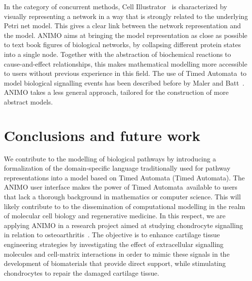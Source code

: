 \documentclass[journal, 10pt]{IEEEtran}
\def\tas{Timed Automata}
\begin{document}
In the category of concurrent methods, Cell Illustrator~\cite{cell-illustrator} is characterized by visually representing
a network in a way that is strongly related to the underlying Petri net model. This gives a clear link between the
network representation and the model. ANIMO aims at bringing 
the model representation as close as possible to text book figures of biological networks, by collapsing different protein states into a 
single node. Together with the abstraction of biochemical reactions to cause-and-effect relationships, this makes mathematical 
modelling more accessible to users without previous experience in this field. 
The use of \tas\ to model biological signalling events has been described before by Maler and Batt~\cite{oded-ta-discretization}. 
ANIMO takes a less general approach, tailored for the construction of more abstract models.



\section{Conclusions and future work}\label{sec:conclusions}
We contribute to the modelling of biological pathways by introducing a formalization of the
domain-specific language traditionally used for pathway representations into a model based on Timed Automata (\tas).
The ANIMO user interface makes the power of \tas\ available 
to users that lack a thorough background in mathematics or computer science. This will likely contribute to to the 
dissemination of computational modelling in the realm of molecular cell biology and regenerative medicine.
In this respect, we are applying ANIMO in a research project aimed at studying
chondrocyte signalling in relation to osteoarthritis~\cite{oa-bio1,oa-bio2}. The objective is to enhance
cartilage tissue engineering strategies by investigating the effect of
extracellular signalling molecules and cell-matrix interactions in order to mimic
these signals in the development of biomaterials that provide direct
support, while stimulating chondrocytes to repair the damaged cartilage tissue.
\end{document}
